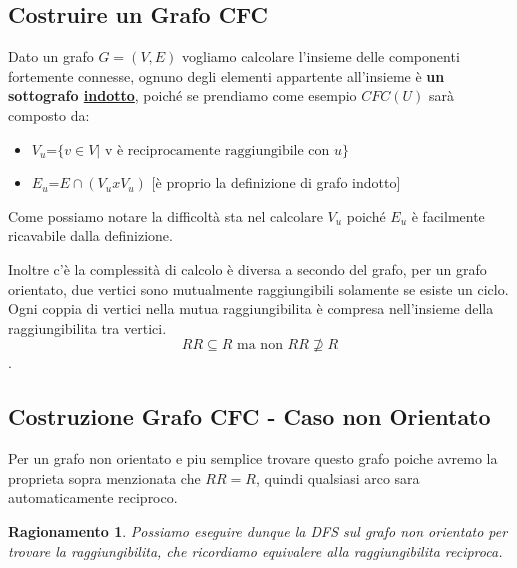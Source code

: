 \subsection{Costruire un Grafo CFC}
Dato un grafo $G=(V,E)$ vogliamo calcolare l'insieme delle componenti fortemente connesse, ognuno degli elementi appartente all'insieme è \textbf{un sottografo \underline{indotto}}, poiché se prendiamo come esempio $CFC(U)$ sarà composto da:\smallskip

\begin{itemize}
    \item $V_u$=$\{v \in V| \text{ v è reciprocamente raggiungibile con } u\}$
    
    \item $E_u$=$E \cap (V_u x V_u)$ [è proprio la definizione di grafo indotto]
\end{itemize}\medskip

Come possiamo notare la difficoltà sta nel calcolare $V_u$ poiché $E_u$ è facilmente ricavabile dalla definizione.


Inoltre c'è la complessità di calcolo è diversa a secondo del grafo, per un grafo orientato, due vertici sono mutualmente raggiungibili solamente se esiste un ciclo.
Ogni coppia di vertici nella mutua raggiungibilita è compresa nell'insieme della raggiungibilita tra vertici.
 $$RR \subseteq R \text{ ma non } RR \not \supseteq R$$.

\subsection{Costruzione Grafo CFC - Caso non Orientato}
Per un grafo non orientato e piu semplice trovare questo grafo poiche avremo la proprieta sopra menzionata che $RR = R$, quindi qualsiasi arco sara automaticamente reciproco.

\newtheorem{ragnonorientato}{Ragionamento}

\begin{ragnonorientato}
	Possiamo eseguire dunque la DFS sul grafo non orientato per trovare la raggiungibilita, che ricordiamo equivalere alla raggiungibilita reciproca.
\end{ragnonorientato}


